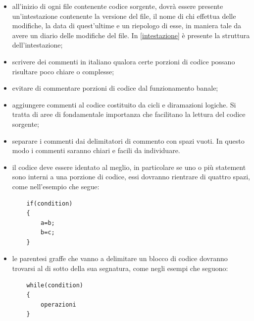  \begin{itemize}
 	\item all'inizio di ogni file contenente codice sorgente, dovrà essere presente un'intestazione contenente la versione del file, il nome di chi effettua delle modifiche, la data di quest'ultime e un riepologo di esse, in maniera tale da avere un diario delle modifiche del file. In \ref{intestazione} è presente la struttura dell'intestazione;
 	\item scrivere dei commenti in italiano qualora certe porzioni di codice possano risultare poco chiare o complesse;
 	\item evitare di commentare porzioni di codice dal funzionamento banale;
 	\item aggiungere commenti al codice costituito da cicli e diramazioni logiche. Si tratta di aree
 	di fondamentale importanza che facilitano la lettura del codice sorgente;
 	\item separare i commenti dai delimitatori di commento con spazi vuoti. In questo modo i
 	commenti saranno chiari e facili da individuare.
 	\item il codice deve essere identato al meglio, in particolare se uno o più statement sono interni a una porzione di codice, essi dovranno rientrare di quattro spazi, come nell'esempio che segue: \begin{lstlisting}
 	if(condition)
 	{
 	    a=b;
 	    b=c;
 	}
 	\end{lstlisting}
 	\item le parentesi graffe che vanno a delimitare un blocco di codice dovranno trovarsi al di sotto della sua segnatura, come negli esempi che seguono:
 	\begin{lstlisting}
 	while(condition)
 	{
 	    operazioni
 	}


\end{lstlisting}
\end{itemize}
